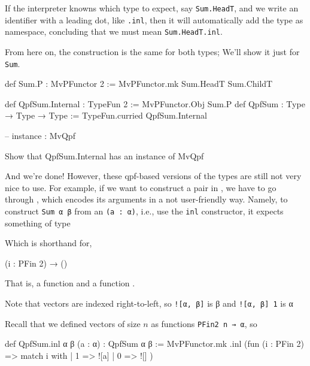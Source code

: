 \documentclass[titlepage]{report}
\newenvironment{remark}{%
\begin{framed}
\begin{trivlist}
    \item[\hskip \labelsep {\bfseries Remark:}]}%
{%
\end{trivlist}%
\end{framed}
}
\newenvironment{todo}{\begin{shaded}\begin{trivlist}                         
    \item[\hskip \labelsep {\bfseries Todo:}]}{\end{trivlist}\end{shaded}}
\begin{document}
\begin{remark}
    If the interpreter knowns which type to expect, say \texttt{Sum.HeadT}, and we write an identifier with a leading
    dot, like \texttt{.inl}, then it will automatically add the type as namespace, concluding that
    we must mean \texttt{Sum.HeadT.inl}.
\end{remark}
From here on, the construction is the same for both types;
We'll show it just for \texttt{Sum}.
\begin{center}
    \begin{leancode}
    def Sum.P  : MvPFunctor 2 := MvPFunctor.mk Sum.HeadT  Sum.ChildT

    
    def QpfSum.Internal : TypeFun 2  := MvPFunctor.Obj Sum.P
    def QpfSum : Type → Type → Type := TypeFun.curried QpfSum.Internal

    -- instance : MvQpf 
  \end{leancode}
\end{center}



\begin{todo}
    Show that QpfSum.Internal has an instance of MvQpf
\end{todo}

And we're done! However, these qpf-based versions of the types are still not very nice to use.
For example, if we want to construct a pair in , we have to go through ,
which encodes its arguments in a not user-friendly way. 
Namely, to construct \texttt{Sum α β} from an \texttt{(a : α)}, i.e., use the \texttt{inl} constructor, 
it expects something of type
\begin{center}
\end{center}
Which is shorthand for, 
\begin{center}
    (i : PFin 2) → ()
\end{center}
That is, a function  and a function .
\begin{remark}
    Note that vectors are indexed right-to-left, so \texttt{![α, β]} is β
    and \texttt{![α, β] 1} is α
\end{remark}

Recall that we defined vectors of size $n$ as functions \texttt{PFin2 n → α}, so 


\begin{leancode}
    def QpfSum.inl {α β} (a : α) : QpfSum α β :=
      MvPFunctor.mk .inl (fun (i : PFin 2) => match i with
        | 1 => ![a]
        | 0 => ![]
      )
\end{leancode}
\end{document}
